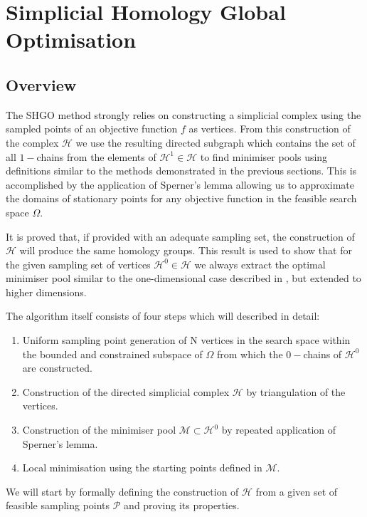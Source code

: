 \chapter{Simplicial Homology Global Optimisation}  \label{sec:shgo}
\section{Overview}
The SHGO method strongly relies on constructing a simplicial complex using the sampled points of an objective function $f$ as vertices. From this construction of the complex $\mathcal{H}$ we use the resulting directed subgraph which contains the set of all $1-$chains from the elements of $\mathcal{H}^1 \in \mathcal{H}$ to find minimiser pools using definitions similar to the methods demonstrated in the previous sections. This is accomplished by the application of Sperner's lemma \citep{Sperner1928} allowing us to approximate the domains of stationary points for any objective function in the feasible search space $\Omega$. 

It is proved that, if provided with an adequate sampling set, the construction of $\mathcal{H}$ will produce the same homology groups. This result is used to show that for the given sampling set of vertices $\mathcal{H}^0 \in \mathcal{H}$ we always extract the optimal minimiser pool similar to the one-dimensional case described in , but extended to higher dimensions. 

The algorithm itself consists of four steps which will described in detail:
\begin{enumerate}
\item Uniform sampling point generation of N vertices in the search space within the bounded and constrained subspace of $\Omega$ from which the $0-$chains of $\mathcal{H}^0$ are constructed.
\item Construction of the directed simplicial complex $\mathcal{H}$ by triangulation of the vertices.
\item Construction of the minimiser pool $\mathcal{M} \subset \mathcal{H}^0$ by repeated application of Sperner's lemma.%
\item Local minimisation using the starting points defined in $\mathcal{M}$.
\end{enumerate}

We will start by formally defining the construction of $\mathcal{H}$ from a given set of feasible sampling points $\mathcal{P}$ and proving its properties. %


